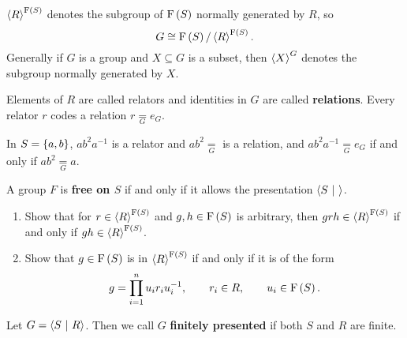 
\begin{notation*}
$ \abr{R}^{\F\br{S}} $ denotes the subgroup of $ \F\br{S} $ normally generated by $ R $, so
$$ G \cong \F\br{S} / \abr{R}^{\F\br{S}}. $$
Generally if $ G $ is a group and $ X \subseteq G $ is a subset, then $ \left\langle X \right\rangle^G $ denotes the subgroup normally generated by $ X $.
\end{notation*}

\begin{note*}
Elements of $ R $ are called relators and identities in $ G $ are called \textbf{relations}. Every relator $ r $ codes a relation $ r \underset{G}{=} e_G $.
\end{note*}

\begin{example*}
In $ S = \cbr{a, b} $, $ ab^2a^{-1} $ is a relator and $ ab^2 \underset{G}{=} $ is a relation, and $ ab^2a^{-1} \underset{G}{=} e_G $ if and only if $ ab^2 \underset{G}{=} a $.
\end{example*}

\begin{remark}
A group $ F $ is \textbf{free on $ S $} if and only if it allows the presentation $ \left\langle S \ \middle| \  \right\rangle $.
\end{remark}

\begin{exercise}
\label{ex:1.5.3}
\hfill
\begin{enumerate}
\item Show that for $ r \in \abr{R}^{\F\br{S}} $ and $ g, h \in \F\br{S} $ is arbitrary, then $ grh \in \abr{R}^{\F\br{S}} $ if and only if $ gh \in \abr{R}^{\F\br{S}} $.
\item Show that $ g \in \F\br{S} $ is in $ \abr{R}^{\F\br{S}} $ if and only if it is of the form
$$ g = \prod_{i = 1}^n u_ir_iu_i^{-1}, \qquad r_i \in R, \qquad u_i \in \F\br{S}. $$
\end{enumerate}
\end{exercise}

\begin{definition}
Let $ G = \left\langle S \ \middle| \  R \right\rangle $. Then we call $ G $ \textbf{finitely presented} if both $ S $ and $ R $ are finite.
\end{definition}

